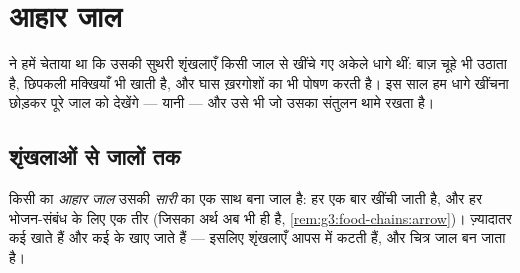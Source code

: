 \chapter{आहार जाल}\label{ch:g5:food-webs}

 ने हमें चेताया था कि उसकी सुथरी शृंखलाएँ किसी
जाल से खींचे गए अकेले धागे थीं: बाज़ चूहे भी उठाता है, छिपकली मक्खियाँ
भी खाती है, और घास ख़रगोशों का भी पोषण करती है। इस साल हम धागे खींचना
छोड़कर पूरे जाल को देखेंगे --- यानी  --- और उसे भी जो उसका
संतुलन थामे रखता है।

\section{शृंखलाओं से जालों तक}

\begin{definition}[आहार जाल]\label{def:g5:food-webs:web}
किसी  का \emph{आहार जाल} उसकी \emph{सारी}  का एक साथ बना जाल है: हर  एक बार खींची जाती है, और हर
भोजन-संबंध के लिए एक तीर (जिसका अर्थ अब भी \emph{}
ही है, \cref{rem:g3:food-chains:arrow})। ज़्यादातर  कई 
खाते हैं और कई के खाए जाते हैं --- इसलिए शृंखलाएँ आपस में कटती हैं, और
चित्र जाल बन जाता है।
\end{definition}

